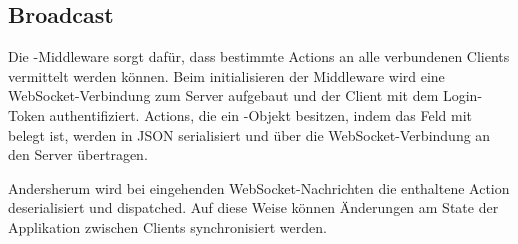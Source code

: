 \subsection{Broadcast}
\label{ssec:fm_broadcast}

Die -Middleware sorgt dafür, dass bestimmte Actions an alle
verbundenen Clients vermittelt werden können.  Beim initialisieren der
Middleware wird eine WebSocket-Verbindung zum Server aufgebaut und der Client mit
dem Login-Token authentifiziert.  Actions, die ein -Objekt besitzen,
indem das Feld  mit  belegt ist, werden in JSON
serialisiert und über die WebSocket-Verbindung an den Server übertragen.

Andersherum wird bei eingehenden WebSocket-Nachrichten die enthaltene Action
deserialisiert und dispatched.  Auf diese Weise können Änderungen am State der
Applikation zwischen Clients synchronisiert werden.
